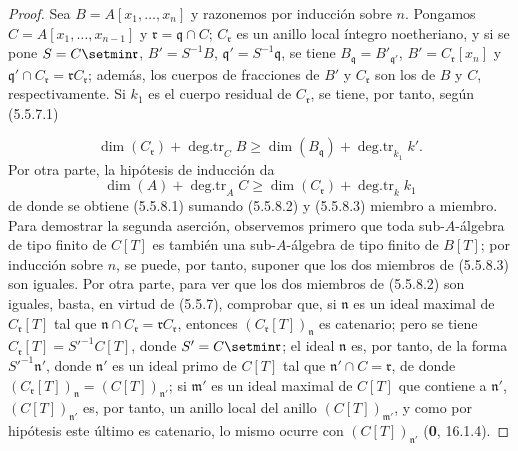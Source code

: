 \begin{proof}
Sea $B=A[x_1,\ldots,x_n]$ y razonemos por inducción sobre $n$. Pongamos
$C=A[x_1,\ldots,x_{n-1}]$ y $\mathfrak r=\mathfrak q\cap C$;
$C_{\mathfrak r}$ es un anillo local íntegro noetheriano, y si se pone
$S=C\setmin\mathfrak r$, $B'=S^{-1}B$, $\mathfrak q'=S^{-1}\mathfrak q$, se tiene
$B_{\mathfrak q}=B'_{\mathfrak q'}$, $B'=C_{\mathfrak r}[x_n]$ y
$\mathfrak q'\cap C_{\mathfrak r}=\mathfrak rC_{\mathfrak r}$; además, los
cuerpos de fracciones
de $B'$ y $C_{\mathfrak r}$ son los de $B$ y $C$,
respectivamente. Si $k_1$ es el cuerpo residual de $C_{\mathfrak r}$, se
tiene, por tanto, según (5.5.7.1)

\begin{equation}
\dim(C_{\mathfrak r})+\operatorname{deg.tr}_C B
\geq\dim(B_{\mathfrak q})+\operatorname{deg.tr}_{k_1}k'.
\tag{5.5.8.2}\label{IV.2.s5.5.8.2-fr}
\end{equation}
Por otra parte, la hipótesis de inducción da
\begin{equation}
\dim(A)+\operatorname{deg.tr}_A C
\geq\dim(C_{\mathfrak r})+\operatorname{deg.tr}_k k_1
\tag{5.5.8.3}\label{IV.2.s5.5.8.3-fr}
\end{equation}
de donde se obtiene (5.5.8.1) sumando (5.5.8.2) y (5.5.8.3) miembro a
miembro. Para demostrar la segunda aserción, observemos primero que toda
sub-$A$-álgebra de tipo finito de $C[T]$ es también una sub-$A$-álgebra de
tipo finito de $B[T]$; por inducción sobre $n$, se puede, por tanto, suponer
que los dos miembros de (5.5.8.3) son iguales. Por otra parte, para ver que
los dos miembros de (5.5.8.2) son iguales, basta, en virtud de (5.5.7),
comprobar que, si $\mathfrak n$ es un ideal maximal de $C_{\mathfrak r}[T]$
tal que $\mathfrak n\cap C_{\mathfrak r}=\mathfrak rC_{\mathfrak r}$,
entonces $(C_{\mathfrak r}[T])_{\mathfrak n}$ es catenario; pero se tiene
$C_{\mathfrak r}[T]=S'^{-1}C[T]$, donde $S'=C\setmin\mathfrak r$; el ideal
$\mathfrak n$ es, por tanto, de la forma $S'^{-1}\mathfrak n'$, donde
$\mathfrak n'$ es un ideal primo de $C[T]$ tal que
$\mathfrak n'\cap C=\mathfrak r$, de donde
$(C_{\mathfrak r}[T])_{\mathfrak n}=(C[T])_{\mathfrak n'}$; si
$\mathfrak m'$ es un ideal maximal de $C[T]$ que contiene a $\mathfrak n'$,
$(C[T])_{\mathfrak n'}$ es, por tanto, un anillo local del anillo
$(C[T])_{\mathfrak m'}$, y como por hipótesis este último es catenario, lo
mismo ocurre con $(C[T])_{\mathfrak n'}$ (\textbf 0, 16.1.4).
\end{proof}

